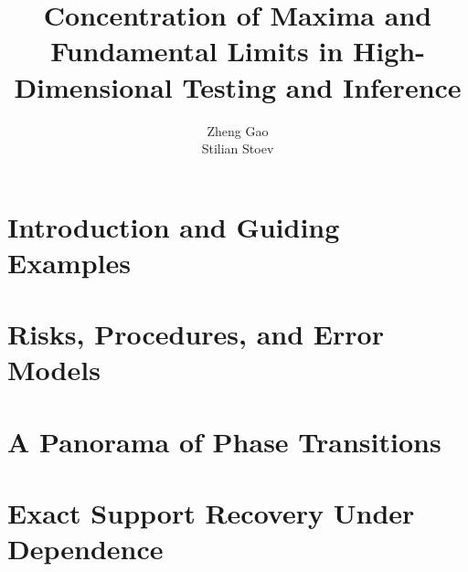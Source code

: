 \documentclass[graybox,envcountchap,sectrefs]{svmono}
\begin{document}
\author{Zheng Gao \\ Stilian Stoev}
\title{Concentration of Maxima and Fundamental Limits in High-Dimensional Testing and Inference}
\maketitle

\frontmatter%

%
%
%            
%





\tableofcontents







\mainmatter%


\chapter{Introduction and Guiding Examples}
\label{chap:intro}


\chapter{Risks, Procedures, and Error Models} %
\label{chap:background}



\chapter{A Panorama of Phase Transitions}
\label{chap:phase-transitions}



\chapter{Exact Support Recovery Under Dependence }%
\label{chap:exact-support-recovery}

\end{document}

